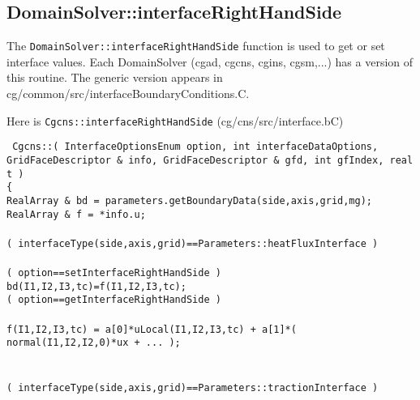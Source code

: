 \clearpage
\subsection{DomainSolver::interfaceRightHandSide} \label{sec:DomainSolver::interfaceRightHandSide}


The {\tt DomainSolver::interfaceRightHandSide} function is used to get or set interface values.
Each DomainSolver (cgad, cgcns, cgins, cgsm,...) has a version of this routine. The generic
version appears in cg/common/src/interfaceBoundaryConditions.C. 


Here is {\tt Cgcns::interfaceRightHandSide} (cg/cns/src/interface.bC)
\begin{flushleft}\tt\small
Cgcns::( InterfaceOptionsEnum option, int interfaceDataOptions,  \\
 \qquad\quad       GridFaceDescriptor \& info, GridFaceDescriptor \& gfd, int gfIndex, real t ) \\
\{  \\
\ia  RealArray \& bd = parameters.getBoundaryData(side,axis,grid,mg); \\
\ia  RealArray \& f = *info.u;  \\
\ia \\
\ia  \IF( interfaceType(side,axis,grid)==Parameters::heatFluxInterface ) \\
\ib     {} \\
\ib     \IF( option==setInterfaceRightHandSide ) \\
\ic       bd(I1,I2,I3,tc)=f(I1,I2,I3,tc);    \\
\ib     \ELSEIF( option==getInterfaceRightHandSide )  \\
\ic       {} \\
\ic       f(I1,I2,I3,tc) = a[0]*uLocal(I1,I2,I3,tc) + a[1]*( normal(I1,I2,I2,0)*ux + ... ); \\
\ib     \END \\
\ia \\
\ia  \ELSEIF( interfaceType(side,axis,grid)==Parameters::tractionInterface ) \\
\ib     {} \\ 

\end{flushleft}
